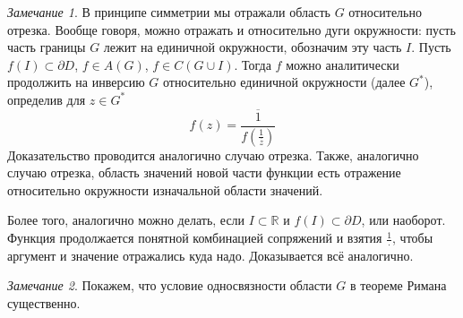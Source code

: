 \documentclass[12pt]{article}
\newcommand{\R}{\mathbb{R}}
\newcommand{\union}{\cup}
\theoremstyle{thmnote}
\theoremstyle{remark}
\newtheorem*{remark}{Замечание}
\theoremstyle{defnote}
\begin{document}
\begin{remark}
    В принципе симметрии мы отражали область $G$ относительно отрезка. Вообще говоря, можно отражать и относительно дуги окружности: пусть часть границы $G$ лежит на единичной окружности, обозначим эту часть $I$. Пусть $f(I) \subset \partial D$, $f \in A(G)$, $f \in C(G \union I)$. Тогда $f$ можно аналитически продолжить на инверсию $G$ относительно единичной окружности (далее $G^*$), определив для $z \in G^*$ 
    $$f(z) = \overline{\frac{1}{f\left(\frac{1}{\overline{z}}\right)}}$$
    Доказательство проводится аналогично случаю отрезка. Также, аналогично случаю отрезка, область значений новой части функции есть отражение относительно окружности изначальной области значений.

    Более того, аналогично можно делать, если $I \subset \R$ и $f(I) \subset \partial D$, или наоборот. Функция продолжается понятной комбинацией сопряжений и взятия $\frac{1}{\cdot}$, чтобы аргумент и значение отражались куда надо. Доказывается всё аналогично.
\end{remark}

\begin{remark}
    Покажем, что условие односвязности области $G$ в теореме Римана существенно.
\end{remark}
\end{document}
